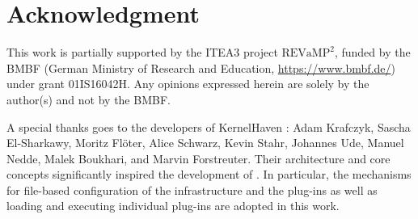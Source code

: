 \section*{Acknowledgment}
This work is partially supported by the ITEA3 project $\text{REVaMP}^2$, funded by the BMBF (German Ministry of Research and Education, \url{https://www.bmbf.de/}) under grant 01IS16042H. Any opinions expressed herein are solely by the author(s) and not by the BMBF.

A special thanks goes to the developers of KernelHaven \cite{Ker18,KES18a,KES18b}: Adam Krafczyk, Sascha El-Sharkawy, Moritz Fl\"oter, Alice Schwarz, Kevin Stahr, Johannes Ude, Manuel Nedde, Malek Boukhari, and Marvin Forstreuter. Their architecture and core concepts significantly inspired the development of \thetool{}. In particular, the mechanisms for file-based configuration of the infrastructure and the plug-ins as well as loading and executing individual plug-ins are adopted in this work.
